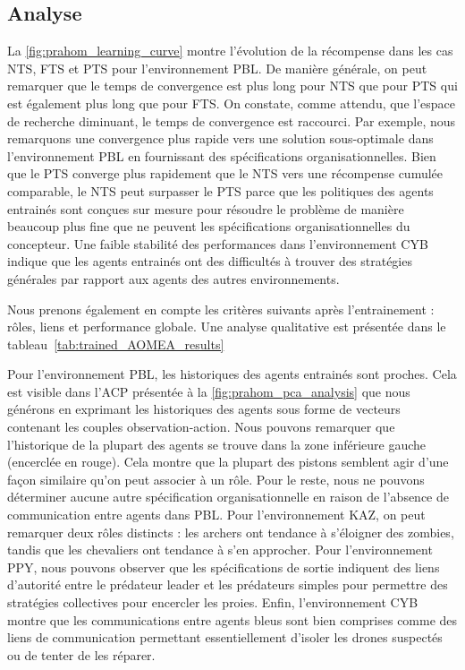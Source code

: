 \documentclass[contribution]{jfsma}
\begin{document}


\subsection{Analyse}

La \autoref{fig:prahom_learning_curve} montre l'évolution de la récompense dans les cas NTS, FTS et PTS pour l'environnement PBL. De manière générale, on peut remarquer que le temps de convergence est plus long pour NTS que pour PTS qui est également plus long que pour FTS. On constate, comme attendu, que l’espace de recherche diminuant, le temps de convergence est raccourci. Par exemple, nous remarquons une convergence plus rapide vers une solution sous-optimale dans l’environnement PBL en fournissant des spécifications organisationnelles. Bien que le PTS converge plus rapidement que le NTS vers une récompense cumulée comparable, le NTS peut surpasser le PTS parce que les politiques des agents entrainés sont conçues sur mesure pour résoudre le problème de manière beaucoup plus fine que ne peuvent les spécifications organisationnelles du concepteur. Une faible stabilité des performances dans l'environnement CYB indique que les agents entrainés ont des difficultés à trouver des stratégies générales par rapport aux agents des autres environnements.

Nous prenons également en compte les critères suivants après l'entrainement : rôles, liens et performance globale. Une analyse qualitative est présentée dans le tableau~\ref{tab:trained_AOMEA_results}
%

%
%
Pour l'environnement PBL, les historiques des agents entrainés sont proches. Cela est visible dans l'ACP présentée à la \autoref{fig:prahom_pca_analysis} que nous générons en exprimant les historiques des agents sous forme de vecteurs contenant les couples observation-action. Nous pouvons remarquer que l'historique de la plupart des agents se trouve dans la zone inférieure gauche (encerclée en rouge). Cela montre que la plupart des pistons semblent agir d'une façon similaire qu'on peut associer à un rôle. Pour le reste, nous ne pouvons déterminer aucune autre spécification organisationnelle en raison de l'absence de communication entre agents dans PBL. Pour l'environnement KAZ, on peut remarquer deux rôles distincts : les archers ont tendance à s'éloigner des zombies, tandis que les chevaliers ont tendance à s'en approcher. Pour l'environnement PPY, nous pouvons observer que les spécifications de sortie indiquent des liens d'autorité entre le prédateur leader et les prédateurs simples pour permettre des stratégies collectives pour encercler les proies. Enfin, l’environnement CYB montre que les communications entre agents bleus sont bien comprises comme des liens de communication permettant essentiellement d’isoler les drones suspectés ou de tenter de les réparer.
\end{document}
